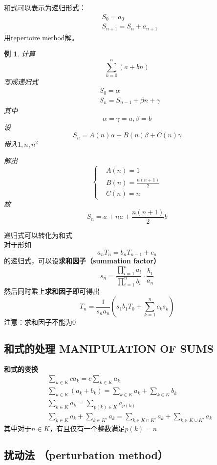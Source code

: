 \documentclass[12pt, a4paper, oneside]{ctexbook}
\newtheorem{example}[theorem]{例}
\newcommand{\newp}[1]{\vspace{#1\baselineskip}\noindent}
\begin{document}
和式可以表示为递归形式：
$$
\begin{aligned}
&S_0=a_0\\
&S_{n+1}=S_{n}+a_{n+1}
\end{aligned}
$$
用repertoire method解。\\
\begin{example}
  计算
$$
\sum_{k=0}^{n}(a+bn)
$$
写成递归式
$$
\begin{aligned}
&S_0=\alpha\\
&S_n=S_{n-1}+\beta n+\gamma
\end{aligned}
$$
其中
$$
\alpha=\gamma=a,\beta =b
$$
设
$$
S_n=A(n) \alpha +B(n) \beta+C(n) \gamma
$$
带入$1,n,n^2$

解出
$$
\begin{cases}
&A(n)=1\\
&B(n)=\frac{n(n+1)}{2}\\
&C(n)=n
\end{cases}
$$
故
$$
S_n=a+na+\frac{n(n+1)}{2}b
$$
\end{example}
\newp{2}

递归式可以转化为和式\\

对于形如
$$
a_nT_n=b_nT_{n-1}+c_n
$$
的递归式，可以设\textbf{求和因子（summation factor）}
$$
s_n=\frac{\prod\limits_{i=1}^{n}a_i}{\prod\limits_{i=1}^{n}b_i}\cdot\frac{b_1}{a_n}
$$
然后同时乘上\textbf{求和因子}即可得出
$$
T_n=\frac{1}{s_na_n}\left(s_1b_1T_0+\sum_{k=1}^{n}c_ks_k \right)
$$
注意：求和因子不能为0

\subsection{和式的处理 MANIPULATION OF SUMS}

\textbf{和式的变换}
$$
\begin{aligned}
&\sum_{k\in K}c a_k=c\sum_{k\in K}a_k\\
&\sum_{k\in K}(a_k+b_k)=\sum_{k \in K}a_k +\sum_{k \in K}b_k\\
&\sum_{k\in K} a_k =\sum_{p(k) \in K} a_{p(k)}\\
&\sum_{k\in K }a_k +\sum_{k\in K'} a_k=\sum_{k\in K\cap K'}a_k + \sum_{k\in K\cup K'} a_k
\end{aligned}
$$
其中对于$n\in K$，有且仅有一个整数满足$p(k)=n$\\

\subsection{扰动法 （perturbation method）}
\end{document}
